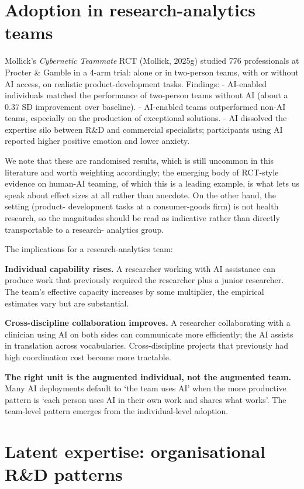 \documentclass[
  letterpaper,
  11pt]{scrbook}
\begin{document}
\section{Adoption in research-analytics
teams}\label{adoption-in-research-analytics-teams}

Mollick's \emph{Cybernetic Teammate} RCT (Mollick, 2025g) studied 776
professionals at Procter \& Gamble in a 4-arm trial: alone or in
two-person teams, with or without AI access, on realistic
product-development tasks. Findings: - AI-enabled individuals matched
the performance of two-person teams without AI (about a 0.37 SD
improvement over baseline). - AI-enabled teams outperformed non-AI
teams, especially on the production of exceptional solutions. - AI
dissolved the expertise silo between R\&D and commercial specialists;
participants using AI reported higher positive emotion and lower
anxiety.

We note that these are randomised results, which is still uncommon in
this literature and worth weighting accordingly; the emerging body of
RCT-style evidence on human-AI teaming, of which this is a leading
example, is what lets us speak about effect sizes at all rather than
anecdote. On the other hand, the setting (product- development tasks at
a consumer-goods firm) is not health research, so the magnitudes should
be read as indicative rather than directly transportable to a research-
analytics group.

The implications for a research-analytics team:

\textbf{Individual capability rises.} A researcher working with AI
assistance can produce work that previously required the researcher plus
a junior researcher. The team's effective capacity increases by some
multiplier, the empirical estimates vary but are substantial.

\textbf{Cross-discipline collaboration improves.} A researcher
collaborating with a clinician using AI on both sides can communicate
more efficiently; the AI assists in translation across vocabularies.
Cross-discipline projects that previously had high coordination cost
become more tractable.

\textbf{The right unit is the augmented individual, not the augmented
team.} Many AI deployments default to `the team uses AI' when the more
productive pattern is `each person uses AI in their own work and shares
what works'. The team-level pattern emerges from the individual-level
adoption.

\section{Latent expertise: organisational R\&D
patterns}\label{latent-expertise-organisational-rd-patterns}
\end{document}
